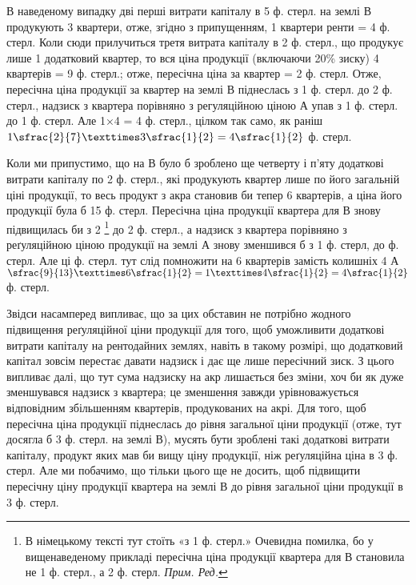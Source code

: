 В наведеному випадку дві перші витрати капіталу в 5 ф. стерл. на землі $В$
продукують 3 квартери, отже, згідно з припущенням, 1
квартери ренти = 4 ф. стерл. Коли сюди прилучиться третя витрата
капіталу в 2 ф. стерл.,
що продукує лише 1 додатковий квартер, то вся ціна продукції (включаючи 20\%
зиску) 4 квартерів = 9 ф. стерл.; отже, пересічна ціна за
квартер = 2 ф. стерл. Отже, пересічна ціна продукції за квартер на землі $В$
піднеслась з 1 ф. стерл.
до 2 ф. стерл., надзиск з квартера порівняно з регуляційною ціною $А$ упав
з 1 ф. стерл. до 1 ф. стерл. Але 1×4 = 4 ф.
стерл., цілком так само,
як раніш $1\sfrac{2}{7} × 3\sfrac{1}{2} = 4\sfrac{1}{2}$ ф. стерл.

Коли ми припустимо, що на В було б зроблено ще четверту і п’яту додаткові
витрати капіталу по 2 ф. стерл., які продукують квартер лише по його
загальній ціні продукції, то весь продукт з акра становив би тепер 6 квартерів,
а ціна його продукції була б 15 ф. стерл. Пересічна ціна продукції
квартера для $В$ знову підвищилась би з 2
\footnote*{В німецькому тексті тут стоїть «з 1 ф. стерл.» Очевидна помилка,
бо у вищенаведеному прикладі пересічна ціна продукції квартера для $В$
становила не 1 ф. стерл., а 2 ф. стерл. \emph{Прим. Ред.}}
до 2 ф. стерл., а надзиск з квартера
порівняно з реґуляційною ціною продукції на землі $А$ знову зменшився
б з 1 ф. стерл, до  ф. стерл. Але ці  ф. стерл. тут слід
помножити на 6 квартерів замість колишніх 4
$А$ $\sfrac{9}{13}×6\sfrac{1}{2} = 1× 4\sfrac{1}{2} = 4\sfrac{1}{2}$ ф. стерл.

Звідси насамперед випливає, що за цих обставин не потрібно жодного підвищення
реґуляційної ціни продукції для того, щоб уможливити додаткові витрати
капіталу на рентодайних землях, навіть в такому розмірі, що додатковий
капітал зовсім перестає давати надзиск і дає ще лише пересічний зиск. З
цього випливає далі, що тут сума надзиску на акр лишається без зміни,
хоч би як дуже зменшувався надзиск з квартера; це зменшення завжди урівноважується
відповідним збільшенням квартерів, продукованих на акрі. Для того,
щоб пересічна ціна продукції піднеслась до рівня загальної ціни продукції (отже,
тут досягла б 3 ф. стерл. на землі $В$), мусять бути зроблені такі додаткові витрати
капіталу, продукт яких мав би вищу ціну продукції, ніж реґуляційна ціна
в 3 ф. стерл. Але ми побачимо, що тільки цього ще не досить, щоб підвищити
пересічну ціну продукції квартера на землі $В$ до рівня загальної ціни продукції
в 3 ф. стерл.

